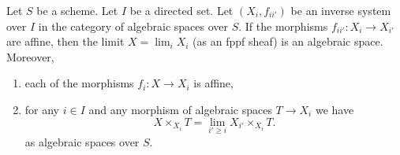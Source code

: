 \begin{lemma}
\label{lemma-directed-inverse-system-has-limit}
Let $S$ be a scheme. Let $I$ be a directed set.
Let $(X_i, f_{ii'})$ be an inverse system over $I$
in the category of algebraic spaces over $S$.
If the morphisms $f_{ii'} : X_i \to X_{i'}$ are affine, then the
limit $X = \lim_i X_i$ (as an fppf sheaf) is an algebraic space.
Moreover,
\begin{enumerate}
\item each of the morphisms $f_i : X \to X_i$ is affine,
\item for any $i \in I$ and any morphism of algebraic spaces
$T \to X_i$ we have
$$
X \times_{X_i} T = \lim_{i' \geq i} X_{i'} \times_{X_i} T.
$$
as algebraic spaces over $S$.
\end{enumerate}
\end{lemma}

